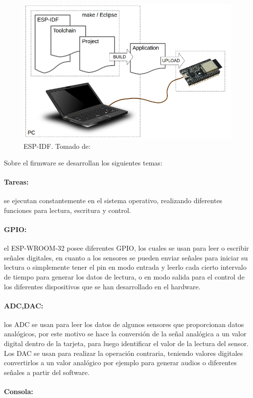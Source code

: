 \begin{figure}[H]
	\centering
	\caption{ESP-IDF. Tomado de: \cite{ES}}
	\label{fig:what-you-need}
	\includegraphics[width=0.5\linewidth]{Imagenes/what-you-need}
\end{figure}


Sobre el firmware se desarrollan los siguientes temas:

\paragraph{Tareas:}

se ejecutan constantemente en el sistema operativo, realizando diferentes funciones para lectura, escritura y control.

\paragraph{GPIO:}

el ESP-WROOM-32 posee diferentes GPIO, los cuales se usan para leer o escribir señales digitales, en cuanto a los sensores se pueden enviar señales para iniciar su lectura o simplemente tener el pin en modo entrada y leerlo cada cierto intervalo de tiempo para generar los datos de lectura, o en modo salida para el control de los diferentes dispositivos que se han desarrollado en el hardware.

\paragraph{ADC,DAC:}

los ADC se usan para leer los datos de algunos sensores que proporcionan datos analógicos, por este motivo se hace la conversión de la señal analógica a un valor digital dentro de la tarjeta, para luego identificar el valor de la lectura del sensor. Los DAC se usan para realizar la operación contraria, teniendo valores digitales convertirlos a un valor analógico por ejemplo para generar audios o diferentes señales a partir del software.

\paragraph{Consola:}

